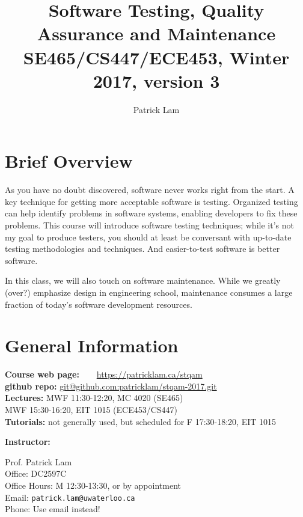 \documentclass{article}
\begin{document}
\title{Software Testing, Quality Assurance and Maintenance\\SE465/CS447/ECE453, Winter 2017, version 3}
\author{Patrick Lam}
\renewcommand{\today}{}
\maketitle
\vspace*{-2em}

\section*{Brief Overview}
As you have no doubt discovered, software never works right from the
start. A key technique for getting more acceptable software is
testing. Organized testing can help identify problems in software
systems, enabling developers to fix these problems.  This course will
introduce software testing techniques; while it's not my goal
to produce testers, you should at least be conversant
with up-to-date testing methodologies and techniques. And easier-to-test
software is better software.

In this class, we will also touch on software maintenance. While we
greatly (over?) emphasize design in engineering school, maintenance
consumes a large fraction of today's software development resources.

\section*{General Information}

\noindent
\begin{tabbing}
  {\bf Course web page:~~~} \= \url{https://patricklam.ca/stqam}\\
  {\bf github repo:}\> \url{git@github.com:patricklam/stqam-2017.git}\\
  {\bf Lectures:} \> MWF 11:30-12:20, MC 4020 (SE465)\\
\> MWF 15:30-16:20, EIT 1015 (ECE453/CS447)\\
{\bf Tutorials:} \> not generally used, but scheduled for F 17:30-18:20, EIT 1015
\end{tabbing}

\noindent
{\bf Instructor:} \\

\noindent
\hspace*{2em} \begin{minipage}{.6\textwidth}
Prof. Patrick Lam\\
Office: DC2597C\\
Office Hours: M 12:30-13:30, or by appointment\\
Email: {\tt patrick.lam@uwaterloo.ca}\\
Phone: Use email instead!

\end{minipage} \\[1em]
\end{document}
